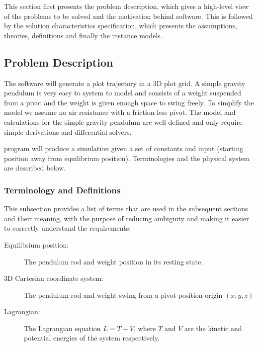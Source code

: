\documentclass[12pt]{article}
\begin{document}
This section first presents the problem description, which gives a high-level
view of the problems to be solved and the motivation behind \progname software.
This is followed by the solution
characteristics specification, which presents the assumptions, theories, 
definitions and finally the instance models.

\subsection{Problem Description}

The \progname software will generate a plot trajectory in a 3D plot grid.
A simple gravity pendulum is very easy to system to model and consists of a
weight suspended from a pivot and the weight is given enough space to swing
freely. To simplify the model we assume no air resistance with a friction-less
pivot. The model and calculations for the simple gravity pendulum are well
defined and only require simple derivations and differential solvers.

\progname program will produce a simulation given a set of constants and input 
(starting position away from equilibrium position).
Terminologies and the physical system are described below.

\subsubsection{Terminology and Definitions}

This subsection provides a list of terms that are used in the subsequent
sections and their meaning, with the purpose of reducing ambiguity and making
it easier to correctly understand the requirements:

\begin{description}
\item[Equilibrium position:] The pendulum rod and weight position in its 
resting state.
\item[3D Cartesian coordinate system:] The pendulum rod and weight swing from a
pivot position origin $(x,y,z)$
\end{description}

\begin{description}
\item[Lagrangian:] The Lagrangian equation $L=T-V$, where $T$ and $V$ are 
the kinetic and potential energies of the system respectively.
\end{description}
\end{document}
